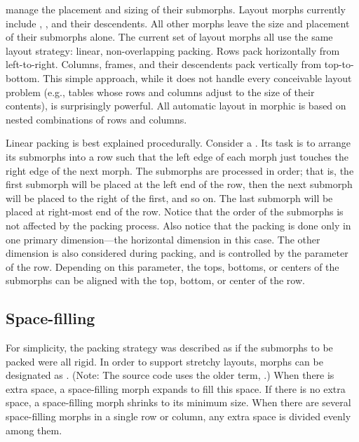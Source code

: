 \documentclass[letterpaper,10pt,english]{sphinxmanual}
\begin{document}
 manage the placement and sizing of their submorphs. Layout morphs currently include , ,  and their descendents. All other morphs leave the size and placement of their submorphs alone. The current set of layout morphs all use the same layout strategy: linear, non-overlapping packing. Rows pack horizontally from left-to-right. Columns, frames, and their descendents pack vertically from top-to-bottom. This simple approach, while it does not handle every conceivable layout problem (e.g., tables whose rows and columns adjust to the size of their contents), is surprisingly powerful. All automatic layout in morphic is based on nested combinations of rows and columns.

Linear packing is best explained procedurally. Consider a . Its task is to arrange its submorphs into a row such that the left edge of each morph just touches the right edge of the next morph. The submorphs are processed in order; that is, the first submorph will be placed at the left end of the row, then the next submorph will be placed to the right of the first, and so on. The last submorph will be placed at right-most end of the row. Notice that the order of the submorphs is not affected by the packing process. Also notice that the packing is done only in one primary dimension—the horizontal dimension in this case. The other dimension is also considered during packing, and is controlled by the  parameter of the row. Depending on this parameter, the tops, bottoms, or centers of the submorphs can be aligned with the top, bottom, or center of the row.


\subsection{Space-filling}
\label{\detokenize{morphic:space-filling}}
For simplicity, the packing strategy was described as if the submorphs to be packed were all rigid. In order to support \sphinxquotedblleft{}stretchy\sphinxquotedblright{} layouts, morphs can be designated as . (Note: The source code uses the older term, .) When there is extra space, a space-filling morph expands to fill this space. If there is no extra space, a space-filling morph shrinks to its minimum size. When there are several space-filling morphs in a single row or column, any extra space is divided evenly among them.
\end{document}
